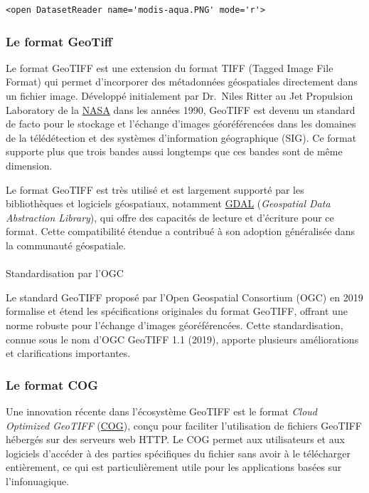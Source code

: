 \documentclass[
  11pt,
  letterpaper,
  open=any,
  twoside=false,
  french]{scrbook}
\makeatletter
\let\oldparagraph\paragraph
\renewcommand{\paragraph}{
    \@ifstar
      \xxxParagraphStar
      \xxxParagraphNoStar
  }
\newcommand{\xxxParagraphStar}[1]{\oldparagraph*{#1}\mbox{}}
\newcommand{\xxxParagraphNoStar}[1]{\oldparagraph{#1}\mbox{}}
\makeatother
\begin{document}
\begin{verbatim}
<open DatasetReader name='modis-aqua.PNG' mode='r'>
\end{verbatim}

\subsubsection{Le format GeoTiff}\label{le-format-geotiff}

Le format GeoTIFF est une extension du format TIFF (Tagged Image File
Format) qui permet d'incorporer des métadonnées géospatiales directement
dans un fichier image. Développé initialement par Dr.~Niles Ritter au
Jet Propulsion Laboratory de la
\href{https://www.earthdata.nasa.gov/esdis/esco/standards-and-practices/geotiff}{NASA}
dans les années 1990, GeoTIFF est devenu un standard de facto pour le
stockage et l'échange d'images géoréférencées dans les domaines de la
télédétection et des systèmes d'information géographique (SIG). Ce
format supporte plus que trois bandes aussi longtemps que ces bandes
sont de même dimension.

Le format GeoTIFF est très utilisé et est largement supporté par les
bibliothèques et logiciels géospatiaux, notamment
\href{https://gdal.org}{GDAL} (\emph{Geospatial Data Abstraction
Library}), qui offre des capacités de lecture et d'écriture pour ce
format. Cette compatibilité étendue a contribué à son adoption
généralisée dans la communauté géospatiale.

\paragraph{Standardisation par l'OGC}\label{standardisation-par-logc}

Le standard GeoTIFF proposé par l'Open Geospatial Consortium (OGC) en
2019 formalise et étend les spécifications originales du format GeoTIFF,
offrant une norme robuste pour l'échange d'images géoréférencées. Cette
standardisation, connue sous le nom d'OGC GeoTIFF 1.1 (2019), apporte
plusieurs améliorations et clarifications importantes.

\subsubsection{Le format COG}\label{le-format-cog}

Une innovation récente dans l'écosystème GeoTIFF est le format
\emph{Cloud Optimized GeoTIFF} (\href{http://cogeo.org/}{COG}), conçu
pour faciliter l'utilisation de fichiers GeoTIFF hébergés sur des
serveurs web HTTP. Le COG permet aux utilisateurs et aux logiciels
d'accéder à des parties spécifiques du fichier sans avoir à le
télécharger entièrement, ce qui est particulièrement utile pour les
applications basées sur l'infonuagique.
\end{document}
